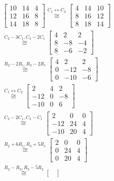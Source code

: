     	\begin{align*}
        	\begin{bmatrix}
        	10 & 14 & 4 \\
        	12 & 16 & 8 \\
        	14 & 18 & 8
        	\end{bmatrix} \stackrel{C_1\leftrightarrow C_3}{\cong} 
        	\begin{bmatrix}
        	4 & 14 & 10 \\
        	8 & 16 & 12 \\
        	8 & 18 & 14
        	\end{bmatrix}& \\  \stackrel{C_2 - 3C_1, C_3 - 2C_1}{\cong} 
        	\begin{bmatrix}
        	4 & 2 & 2 \\
        	8 & -8 & -4 \\
        	8 & -6 & -2
        	\end{bmatrix}& \\ \stackrel{R_2 - 2R_1, R_3 - 2R_1}{\cong}
        	\begin{bmatrix}
        	4 & 2 & 2 \\
        	0 & -12 & -8 \\
        	0 & -10 & -6
        	\end{bmatrix}& \\ \stackrel{C_1\leftrightarrow C_2}{\cong} 
        	\begin{bmatrix}
        	2 & 4 & 2 \\
        	-12 & 0 & -8 \\
        	-10 & 0 & 6
        	\end{bmatrix}& \\ \stackrel{C_2 - 2C_1, C_3 - C_1}{\cong} 
        	\begin{bmatrix}
        	2 & 0 & 0 \\
        	-12 & 24 & 4 \\
        	-10 & 20 & 4
        	\end{bmatrix}& \\ \stackrel{R_2 + 6R_1, R_3 + 5R_1}{\cong} 
        	\begin{bmatrix}
        	2 & 0 & 0 \\
        	0 & 24 & 4 \\
        	0 & 20 & 4
        	\end{bmatrix}& \\ \stackrel{R_2 - R_3, R_3 - 5R_2}{\cong} 
        	\begin{bmatrix}

\end{bmatrix}
\end{align*}
